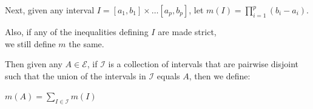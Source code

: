 \documentclass{book}
\newcommand{\teachComment}{
   \color{Orange}%
   \fontsize{12}{14}\selectfont%
}
\newenvironment{myIndent}{%
   \begin{adjustwidth}{2.5em}{0em}%
}{%
   \end{adjustwidth}%
}
\newenvironment{myTindent}{%
   \begin{adjustwidth}{7.5em}{0em}%
}{%
   \end{adjustwidth}%
}
\newcommand{\retTwo}{\hfill\bigbreak}
\begin{document}
Next, given any interval $I = [a_1, b_1]\times \ldots [a_p, b_p]$, let $m(I) = \prod\limits_{i=1}^p(b_i - a_i)$.\\ [-4pt]
{\begin{myTindent}\begin{myIndent}\teachComment
   Also, if any of the inequalities defining $I$ are made strict,\\ we still define $m$ the same.\retTwo
\end{myIndent}\end{myTindent}}

\newpage

Then given any $A \in \mathcal{E}$, if $\mathcal{I}$ is a collection of intervals that are pairwise disjoint\\ such that the union of the intervals in $\mathcal{I}$ equals $A$, then we define:

{\center $m(A) = \sum\limits_{I \in \mathcal{I}}m(I)$\retTwo\par}
\end{document}
